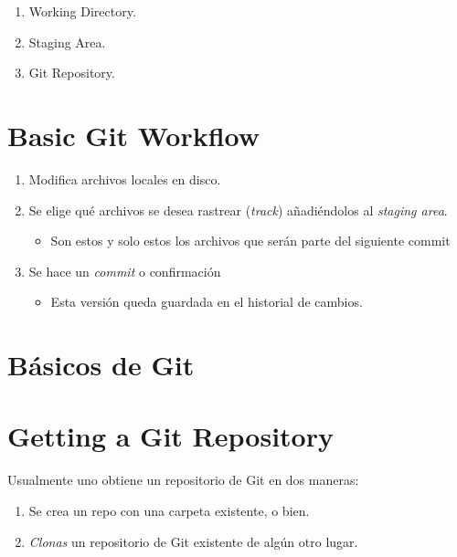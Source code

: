 \begin{enumerate}
\def\labelenumi{\arabic{enumi}.}
\item
  Working Directory.
\item
  Staging Area.
\item
  Git Repository.
\end{enumerate}

\section{Basic Git Workflow}

\begin{enumerate}
\def\labelenumi{\arabic{enumi}.}
\item
  Modifica archivos locales en disco.
\item
  Se elige qué archivos se desea rastrear (\emph{track}) añadiéndolos al
  \emph{staging area}.

  \begin{itemize}
  \tightlist
  \item
    Son estos y solo estos los archivos que serán parte del siguiente
    commit
  \end{itemize}
\item
  Se hace un \emph{commit} o confirmación

  \begin{itemize}
  \tightlist
  \item
    Esta versión queda guardada en el historial de cambios.
  \end{itemize}
\end{enumerate}

\section{Básicos de Git}

\section{Getting a Git Repository}

Usualmente uno obtiene un repositorio de Git en dos maneras:

\begin{enumerate}
\def\labelenumi{\arabic{enumi}.}
\item
  Se crea un repo con una carpeta existente, o bien.
\item
  \emph{Clonas} un repositorio de Git existente de algún otro lugar.
\end{enumerate}

